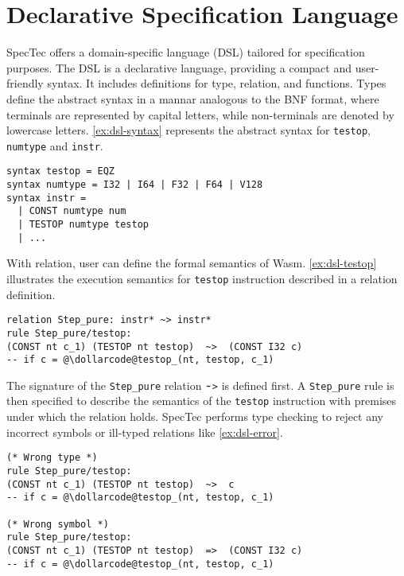 
\chapter{Declarative Specification Language}
\label{ch:dsl}
\noindent


SpecTec offers a domain-specific language (DSL) tailored for specification
purposes.
The DSL is a declarative language, providing a compact and user-friendly syntax.
It includes definitions for type, relation, and functions.
Types define the abstract syntax in a mannar analogous to the BNF format, where
terminals are represented by capital letters, while non-terminals are denoted
by lowercase letters.
\cref{ex:dsl-syntax} represents the abstract syntax for \texttt{testop},
\texttt{numtype} and \texttt{instr}.
\\
\begin{example}
\begin{lstlisting}[style=dsl]
syntax testop = EQZ
syntax numtype = I32 | I64 | F32 | F64 | V128
syntax instr =
  | CONST numtype num
  | TESTOP numtype testop
  | ...
\end{lstlisting}
\label{ex:dsl-syntax}
\end{example}


With relation, user can define the formal semantics of Wasm.
\cref{ex:dsl-testop} illustrates the execution semantics for \texttt{testop}
instruction described in a relation definition.
\\
\begin{example}
\begin{lstlisting}[style=dsl]
relation Step_pure: instr* ~> instr*
rule Step_pure/testop:
(CONST nt c_1) (TESTOP nt testop)  ~>  (CONST I32 c)
-- if c = @\dollarcode@testop_(nt, testop, c_1)
\end{lstlisting}
  \label{ex:dsl-testop}
\end{example}
The signature of the \texttt{Step\_pure} relation $\tildecode$\texttt{>} is
defined first.
A \texttt{Step\_pure} rule is then specified to describe the semantics of the
\texttt{testop} instruction with premises under which the relation holds.
SpecTec performs type checking to reject any incorrect symbols or ill-typed
relations like \cref{ex:dsl-error}.
\\
\begin{example}
\begin{lstlisting}[style=dsl]
(* Wrong type *)
rule Step_pure/testop:
(CONST nt c_1) (TESTOP nt testop)  ~>  c
-- if c = @\dollarcode@testop_(nt, testop, c_1)

(* Wrong symbol *)
rule Step_pure/testop:
(CONST nt c_1) (TESTOP nt testop)  =>  (CONST I32 c)
-- if c = @\dollarcode@testop_(nt, testop, c_1)
\end{lstlisting}
  \label{ex:dsl-error}
\end{example}



